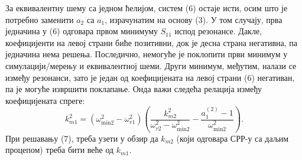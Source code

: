 \documentclass[main.tex]{subfiles}
\begin{document}
За еквивалентну шему са једном ћелијом, систем (6) остаје исти, осим што је потребно заменити $a_2$ са $a_1$, израчунатим на основу (3). У том случају, прва једначина у (6) одговара првом минимуму $S_{11}$ испод резонансе. Дакле, коефицијенти на левој страни биће позитивни, док је десна страна негативна, па једначина нема решења. Последично, немогуће је поклопити први минимум у симулацији/мерењу и еквивалентној шеми. Други минимум, међутим, налази се између резонанси, зато је један од коефицијената на левој страни (6) негативан, па је могуће извршити поклапање. Онда важи следећа релација између коефицијената спреге:
\begin{equation}
k_{m1}^2 = \left(\omega_\text{min2}^2-\omega_{r1}^2 \right) \left(\frac{k_{m2}^2}{\omega_{r2}^2-\omega_\text{min2}^2 } - \frac{a_1^{(2)}-1}{\omega_\text{min2}^2}\right).
\end{equation}
При решавању (7), треба узети у обзир да $k_{m2}$
(који одговара СРР-у са даљим процепом) треба бити веће од $k_{m1}$. 
\end{document}
